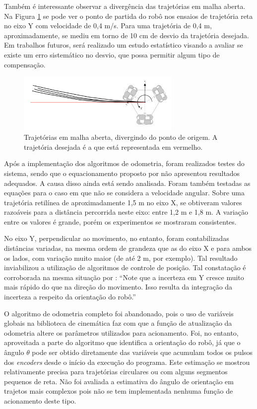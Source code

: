 Também é interessante observar a divergência das trajetórias em malha aberta. Na Figura \ref{fig:traj_y} se pode ver o ponto de partida do robô nos ensaios de trajetória reta no eixo Y com velocidade de 0,4 m/s. Para uma trajetória de 0,4 m, aproximadamente, se mediu em torno de 10 cm de desvio da trajetória desejada. Em trabalhos futuros, será realizado um estudo estatístico visando a avaliar se existe um erro sistemático no desvio, que possa permitir algum tipo de compensação.

\begin{figure}[h]
  \centering
  \includegraphics[width = 0.7\textwidth]{imagens/traj_y}
  \caption{Trajetórias em malha aberta, divergindo do ponto de origem. A trajetória desejada é a que está representada em vermelho.}
  \label{fig:traj_y}
\end{figure}

Após a implementação dos algoritmos de odometria, foram realizados testes do sistema, sendo que o equacionamento proposto por \citet{lynch2017modern} não apresentou resultados adequados. A causa disso ainda está sendo analisada. Foram também testadas as equações para o caso em que não se considera a velocidade angular. Sobre uma trajetória retilínea de aproximadamente 1,5 m no eixo X, se obtiveram valores razoáveis para a distância percorrida neste eixo: entre 1,2 m e 1,8 m. A variação entre os valores é grande, porém os experimentos se mostraram consistentes.

No eixo Y, perpendicular ao movimento, no entanto, foram contabilizadas distâncias variadas, na mesma ordem de grandeza que as do eixo X e para ambos os lados, com variação muito maior (de até 2 m, por exemplo). Tal resultado inviabilizou a utilização de algoritmos de controle de posição. Tal constatação é corroborada na mesma situação por \citet{siegwart2011introduction}: ``Note que a incerteza em Y cresce muito mais rápido do que na direção do movimento. Isso resulta da integração da incerteza a respeito da orientação do robô.''

O algoritmo de odometria completo foi abandonado, pois o uso de variáveis globais na biblioteca de cinemática faz com que a função de atualização da odometria altere os parâmetros utilizados para acionamento. Foi, no entanto, aproveitada a parte do algoritmo que identifica a orientação do robô, já que o ângulo $\theta$ pode ser obtido diretamente das variáveis que acumulam todos os pulsos dos \textit{encoders} desde o início da execução do programa. Este estimação se mostrou relativamente precisa para trajetórias circulares ou com alguns segmentos pequenos de reta. Não foi avaliada a estimativa do ângulo de orientação em trajetos mais complexos pois não se tem implementada nenhuma função de acionamento deste tipo.
